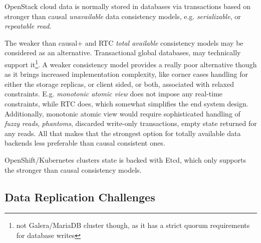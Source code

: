 \documentclass[conference]{IEEEtran}
\begin{document}
OpenStack cloud data is normally stored in databases via
transactions based on stronger than causal \textit{unavailable}\cite{b4} data
consistency models, e.g.  \textit{serializable}\cite{b4}, or \textit{repeatable
read}\cite{b4}.

The weaker than causal+ and RTC \textit{total available}\cite{b4}
consistency models may be considered as an alternative. Transactional global
databases\cite{b5}, may technically support it\footnote{not Galera/MariaDB
cluster though, as it has a strict quorum requirements for database writes}. A
weaker consistency model provides a really poor alternative though as it brings
increased implementation complexity, like corner cases handling for either the
storage replicas, or client sided, or both, associated with relaxed
constraints. E.g. \textit{monotonic atomic view}\cite{b4} does not impose any
real-time constraints, while RTC does, which somewhat simplifies
the end system design. Additionally, monotonic atomic view would require
sophisticated handling of \textit{fuzzy reads}\cite{b4},
\textit{phantoms}\cite{b4}, discarded write-only transactions, empty state
returned for any reads. All that makes that the strongest option for totally
available data backends less preferable than causal consistent ones.

OpenShift/Kubernetes clusters state is backed with Etcd, which only supports
the stronger than causal consistency models.

\subsection{Data Replication Challenges}
\end{document}
